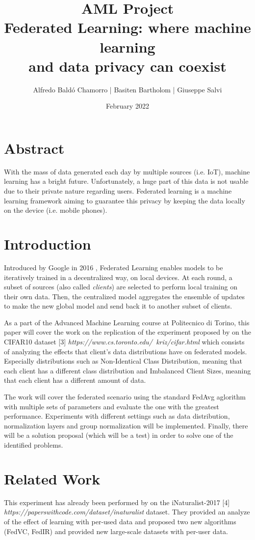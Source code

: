 \documentclass[twocolumn]{article}
\title{\textbf{AML Project}
\\Federated Learning: where machine learning \\and data privacy can coexist
}
\author{
Alfredo Baldó Chamorro | 
Basiten Bartholom |
Giuseppe Salvi
}
\date{February 2022}
\begin{document}
\maketitle

\section{Abstract}
With the mass of data generated each day by multiple sources (i.e. IoT), machine learning has a bright future. Unfortunately, a huge part of this data is not usable due to their private nature regarding users. Federated learning is a machine learning framework aiming to guarantee this privacy by keeping the data locally on the device (i.e. mobile phones).
\section{Introduction} %

Introduced by Google in 2016 \cite{DBLP:journals/corr/KonecnyMYRSB16}, Federated Learning enables models to be iteratively trained in a decentralized way, on local devices. At each round, a subset of sources (also called \emph{clients}) are selected to perform local training on their own data. Then, the centralized model aggregates the ensemble of updates to make the new global model and send back it to another subset of clients. 

As a part of the Advanced Machine Learning course at Politecnico di Torino, this paper will cover the work on the replication of the experiment proposed by \cite{DBLP:journals/corr/abs-2003-08082} on the CIFAR10 dataset [3] \emph{https://www.cs.toronto.edu/~kriz/cifar.html} which consists of analyzing the effects that client's data distributions have on federated models. Especially distributions such as Non-Identical Class Distribution, meaning that each client has a different class distribution and Imbalanced Client Sizes, meaning that each client has a different amount of data. 

The work will cover the federated scenario using the standard FedAvg aglorithm with multiple sets of parameters and evaluate the one with the greatest performance. Experiments with different settings such as data distribution, normalization layers and group normalization will be implemented. Finally, there will be a solution proposal (which will be a test) in order to solve one of the identified problems.

\section{Related Work} %
This experiment has already been performed by \cite{DBLP:journals/corr/abs-2003-08082}  on the iNaturalist-2017 [4] \emph{https://paperswithcode.com/dataset/inaturalist} dataset. They provided an analyze of the effect of learning with per-used data and proposed two new algorithms (FedVC, FedIR) and provided new large-scale datasets with per-user data.
\end{document}
